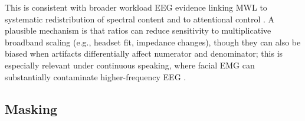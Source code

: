 \documentclass[lettersize,journal]{IEEEtran}
\begin{document}





This is consistent with broader workload EEG evidence linking MWL to systematic redistribution of spectral content \cite{chikhiEEGPowerSpectral2022} and to attentional control \cite{putman_eeg_2014}. A plausible mechanism is that ratios can reduce sensitivity to multiplicative broadband scaling (e.g., headset fit, impedance changes), though they can also be biased when artifacts differentially affect numerator and denominator; this is especially relevant under continuous speaking, where facial EMG can substantially contaminate higher-frequency EEG \cite{whithamScalpElectricalRecordingParalysis2007, deVosRemovalMuscleArtifactsSpokenLanguage2010}.


\subsection{Masking}

\end{document}
